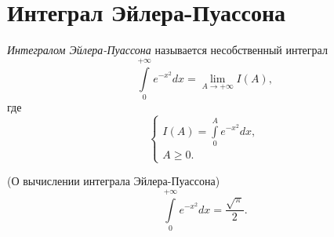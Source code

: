 \documentclass[../../main.tex]{subfiles}
\begin{document}
\section{Интеграл Эйлера-Пуассона}
	\begin{defn}
		\emph{Интегралом Эйлера-Пуассона} называется несобственный интеграл 
		\begin{equation}
		 	\label{lec17:1}
            \int\limits_0^{+\infty}e^{-x^2}dx = \lim\limits_{A\to +\infty} 
            I(A),
		\end{equation}
        где
		\begin{equation}
		 	\label{lec17:2}
            \begin{cases}
                I(A) = \int\limits_0^{A}e^{-x^2}dx, \\
                A \geq 0.
            \end{cases}
		\end{equation}
        \end{defn}
		
		\begin{theorem}
		 (О вычислении интеграла Эйлера-Пуассона)
		 \begin{equation}
          \label{lec17:3}
		  \int\limits_0^{+\infty}e^{-x^2}dx = \frac{\sqrt{\pi}}{2}.
		 \end{equation}

		\end{theorem}
		
\end{document}
